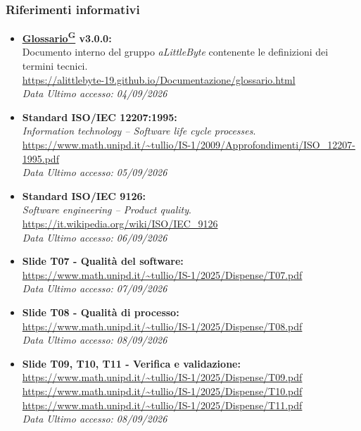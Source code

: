 \documentclass[a4paper,12pt]{article}
\providecommand{\glslink}[2]{\href{https://alittlebyte-19.github.io/Documentazione/glossario.html\#gls-#1}{\underline{#2}\textsuperscript{\scriptsize G}}}
\begin{document}
\subsubsection{Riferimenti informativi}
\begin{itemize}
    \item \textbf{\glslink{glossario}{Glossario} v3.0.0:}\\
    Documento interno del gruppo \textit{aLittleByte} contenente le definizioni dei termini tecnici.\\
    \url{https://alittlebyte-19.github.io/Documentazione/glossario.html}\\
    \textit{Data Ultimo accesso: 04/09/2026}

    \item \textbf{Standard ISO/IEC 12207:1995:}\\
    \textit{Information technology -- Software life cycle processes}.\\
    \url{https://www.math.unipd.it/~tullio/IS-1/2009/Approfondimenti/ISO_12207-1995.pdf}\\
    \textit{Data Ultimo accesso: 05/09/2026}

    \item \textbf{Standard ISO/IEC 9126:}\\
    \textit{Software engineering -- Product quality}.\\
    \url{https://it.wikipedia.org/wiki/ISO/IEC_9126}\\
    \textit{Data Ultimo accesso: 06/09/2026}

    \item \textbf{Slide T07 - Qualità del software:}\\
    \url{https://www.math.unipd.it/~tullio/IS-1/2025/Dispense/T07.pdf}\\
    \textit{Data Ultimo accesso: 07/09/2026}

    \item \textbf{Slide T08 - Qualità di processo:}\\
    \url{https://www.math.unipd.it/~tullio/IS-1/2025/Dispense/T08.pdf}\\
    \textit{Data Ultimo accesso: 08/09/2026}

    \item \textbf{Slide T09, T10, T11 - Verifica e validazione:}\\
    \url{https://www.math.unipd.it/~tullio/IS-1/2025/Dispense/T09.pdf}\\
    \url{https://www.math.unipd.it/~tullio/IS-1/2025/Dispense/T10.pdf}\\
    \url{https://www.math.unipd.it/~tullio/IS-1/2025/Dispense/T11.pdf}\\
    \textit{Data Ultimo accesso: 08/09/2026}
\end{itemize}
\end{document}
